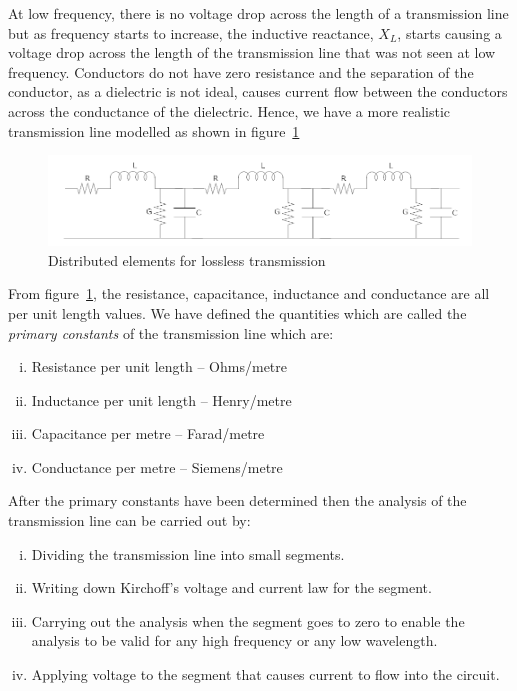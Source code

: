 At low frequency, there is no voltage drop across the length of a transmission line but as frequency starts to increase, the inductive reactance, $X_{L}$, starts causing a voltage drop across the length of the transmission line that was not seen at low frequency. Conductors do not have zero resistance and the separation of the conductor, as a dielectric is not ideal, causes current flow between the conductors across the conductance of the dielectric. Hence, we have a more realistic transmission line modelled as shown in figure~\ref{fig:sixth}
\begin{figure}[h]
\centering
\includegraphics[width=1\linewidth]{./graphics/sixth}
\caption{Distributed elements for lossless transmission}
\label{fig:sixth}
\end{figure}


From figure~\ref{fig:sixth}, the resistance, capacitance, inductance and conductance are all per unit length values. We have defined the quantities which are called the \textit{primary constants} of the transmission line which are:
\begin{enumerate}[(i)]
\item Resistance per unit length – Ohms/metre
\item Inductance per unit length – Henry/metre
\item Capacitance per metre – Farad/metre
\item Conductance per metre – Siemens/metre
\end{enumerate}
After the primary constants have been determined then the analysis of the transmission line can be carried out by:
\begin{enumerate}[(i)]

\item Dividing the transmission line into small segments.
\item Writing down Kirchoff's voltage and current law for the segment.
\item Carrying out the analysis when the segment goes to zero to enable the analysis to be valid for any high frequency or any low wavelength. 
\item Applying voltage to the segment that causes current to flow into the circuit.
\end{enumerate}


